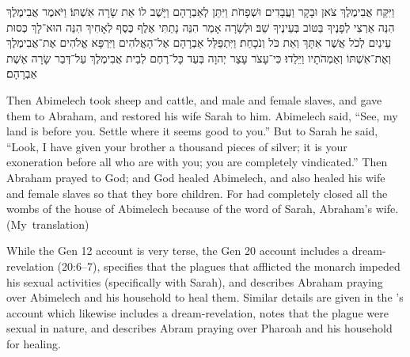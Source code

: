 \begin{hebrewtext}
    וַיִּקַּח אֲבִימֶלֶךְ צֹאן וּבָקָר וַעֲבָדִים וּשְׁפָחֹת וַיִּתֵּן לְאַבְרָהָם וַיָּשֶׁב לוֹ אֵת שָׂרָה אִשְׁתּוֹ׃
    וַיֹּאמֶר אֲבִימֶלֶךְ הִנֵּה אַרְצִי לְפָנֶיךָ בַּטּוֹב בְּעֵינֶיךָ שֵׁב׃
    וּלְשָׂרָה אָמַר הִנֵּה נָתַתִּי אֶלֶף כֶּסֶף לְאָחִיךְ הִנֵּה הוּא־לָךְ כְּסוּת עֵינַיִם לְכֹל אֲשֶׁר אִתָּךְ וְאֵת כֹּל וְנֹכָחַת׃
    וַיִּתְפַּלֵּל אַבְרָהָם אֶל־הָאֱלֹהִים וַיִּרְפָּא אֱלֹהִים אֶת־אֲבִימֶלֶךְ וְאֶת־אִשְׁתּוֹ וְאַמְהֹתָיו וַיֵּלֵדוּ׃
    כִּי־עָצֹר עָצַר יְהוָה בְּעַד כָּל־רֶחֶם לְבֵית אֲבִימֶלֶךְ עַל־דְּבַר שָׂרָה אֵשֶׁת אַבְרָהָם׃  
\end{hebrewtext}

\begin{translation}
    Then Abimelech took sheep and cattle, and male and female slaves, and gave them to Abraham, and restored his wife Sarah to him.
    Abimelech said, ``See, my land is before you. Settle where it seems good to you.'' 
    But to Sarah he said, ``Look, I have given your brother a thousand pieces of silver; it is your exoneration before all who are with you; you are completely vindicated.'' 
    Then Abraham prayed to God; and God healed Abimelech, and also healed his wife and female slaves so that they bore children. 
    For \yahweh had completely closed all the wombs of the house of Abimelech because of the word of Sarah, Abraham's wife. (My~translation)
\end{translation}

While the Gen 12 account is very terse, the Gen 20 account includes a dream-revelation (20:6--7), specifies that the plagues that afflicted the monarch impeded his sexual activities (specifically with Sarah), and describes Abraham praying over Abimelech and his household to heal them. Similar details are given in the \ga's account which likewise includes a dream-revelation, notes that the plague were sexual in nature, and describes Abram praying over Pharoah and his household for healing. 

